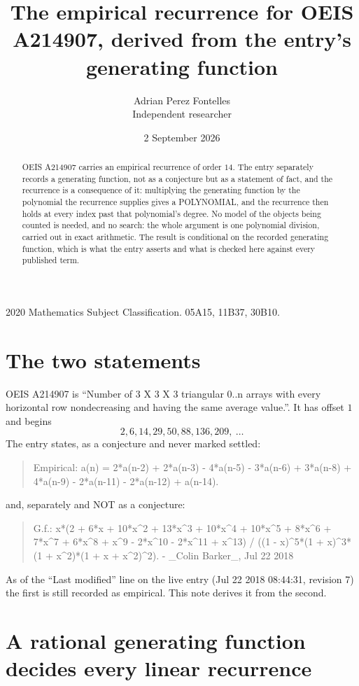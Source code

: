 \documentclass[11pt,a4paper]{article}
\title{The empirical recurrence for OEIS A214907, derived from the entry's generating function}
\author{Adrian Perez Fontelles\\ \small Independent researcher}
\date{2 September 2026}
\theoremstyle{plain}
\theoremstyle{definition}
\begin{document}
\maketitle

\begin{abstract}
OEIS A214907 carries an empirical recurrence of order $14$. The entry separately records a
generating function, not as a conjecture but as a statement of fact, and the recurrence is a
consequence of it: multiplying the generating function by the polynomial the recurrence
supplies gives a POLYNOMIAL, and the recurrence then holds at every index past that
polynomial's degree. No model of the objects being counted is needed, and no search: the
whole argument is one polynomial division, carried out in exact arithmetic. The result is
conditional on the recorded generating function, which is what the entry asserts and what is
checked here against every published term.
\end{abstract}

\noindent\small 2020 Mathematics Subject Classification. 05A15, 11B37, 30B10.\normalsize

\section{The two statements}

OEIS A214907 is ``Number of 3 X 3 X 3 triangular 0..n arrays with every horizontal row nondecreasing and having the same average value.''. It has offset $1$ and begins
\[
2, 6, 14, 29, 50, 88, 136, 209,\ \dots
\]
The entry states, as a conjecture and never marked settled:
\begin{quote}
Empirical: a(n) = 2*a(n-2) + 2*a(n-3) - 4*a(n-5) - 3*a(n-6) + 3*a(n-8) + 4*a(n-9) - 2*a(n-11) - 2*a(n-12) + a(n-14).
\end{quote}
and, separately and NOT as a conjecture:
\begin{quote}
G.f.: x*(2 + 6*x + 10*x\^{}2 + 13*x\^{}3 + 10*x\^{}4 + 10*x\^{}5 + 8*x\^{}6 + 7*x\^{}7 + 6*x\^{}8 + x\^{}9 - 2*x\^{}10 - 2*x\^{}11 + x\^{}13) / ((1 - x)\^{}5*(1 + x)\^{}3*(1 + x\^{}2)*(1 + x + x\^{}2)\^{}2). - \_Colin Barker\_, Jul 22 2018
\end{quote}
As of the ``Last modified'' line on the live entry (Jul 22 2018 08:44:31, revision 7) the first is still
recorded as empirical. This note derives it from the second.

\section{A rational generating function decides every linear recurrence}
\end{document}
